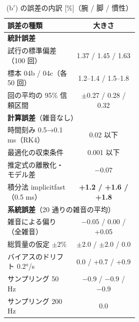 \documentclass[paper=a4paper,fontsize=10pt,twocolumn,column_gap=2zw,line_length=24zw,number_of_lines=46,head_space=20mm]{jlreq}
\begin{document}
\begin{table}[t]\centering\small
\caption{推定誤差（平均 $\pm$ 標準偏差 [\%]、腕 / 脚 / 慣性）。(a)(b) は field04b の 50 回。(b$'$) は独立な 2 標本（field04b・04c）をまとめた 100 回で、平均の 95\% 信頼区間の半幅は 0.27〜0.32\%。}\label{tab:calib}
\footnotesize\setlength{\tabcolsep}{2pt}
\end{table}

\begin{table}[t]\centering\small
\caption{(b$'$) の誤差の内訳 [\%]（腕 / 脚 / 慣性）}\label{tab:budget}
\setlength{\tabcolsep}{3pt}
\begin{tabular}{p{0.52\linewidth}c}\toprule
誤差の種類 & 大きさ \\\midrule
\multicolumn{2}{l}{\textbf{統計誤差}} \\
\quad 1 試行の標準偏差（100 回） & 1.37 / 1.45 / 1.63 \\
\quad \quad 標本 04b / 04c（各 50 回） & 1.2--1.4 / 1.5--1.8 \\
\quad 100 回の平均の 95\% 信頼区間 & $\pm$0.27 / 0.28 / 0.32 \\
\multicolumn{2}{l}{\textbf{計算誤差}（雑音なし）} \\
\quad 時間刻み 0.5→0.1 ms（RK4） & 0.02 以下 \\
\quad 最適化の収束条件 & 0.001 以下 \\
\quad 推定式の離散化・モデル差 & $-0.07$ \\
\quad 積分法 implicitfast（0.5 ms） & \textbf{+1.2 / +1.6 / +1.8} \\
\multicolumn{2}{l}{\textbf{系統誤差}（20 通りの雑音の平均）} \\
\quad 雑音による偏り（全雑音） & $-0.05$ / 0.00 / +0.05 \\
\quad 総質量の仮定 $\pm2\%$ & $\pm2.0$ / $\pm2.0$ / 0.0 \\
\quad バイアスのドリフト 0.2°/s & 0.0 / +0.7 / +0.9 \\
\quad サンプリング 50 Hz & $-0.9$ / $-0.9$ / $-0.9$ \\
\quad サンプリング 200 Hz & 0.0 \\\bottomrule
\end{tabular}
\end{table}
\end{document}
